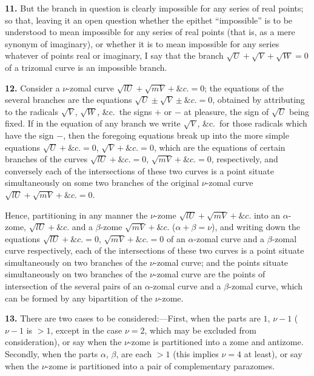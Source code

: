 \documentclass[11pt,a4paper]{article}
\theoremstyle{definition}
\begin{document}
\noindent\textbf{11.} But the branch in question is clearly impossible for any series of real points; so that, leaving it an open question whether the epithet ``impossible'' is to be understood to mean impossible for any series of real points (that is, as a mere synonym of imaginary), or whether it is to mean impossible for any series whatever of points real or imaginary, I say that the branch $\sqrt{U}+\sqrt{V}+\sqrt{W}=0$ of a trizomal curve is an impossible branch.

\setcounter{page}{476}

\noindent\textbf{12.} Consider a $\nu$-zomal curve $\sqrt{lU}+\sqrt{mV}+\&c.=0$; the equations of the several branches are the equations $\sqrt{U}\pm\sqrt{V}\pm\&c.=0$, obtained by attributing to the radicals $\sqrt{V}$, $\sqrt{W}$, \&c.\ the signs $+$ or $-$ at pleasure, the sign of $\sqrt{U}$ being fixed. If in the equation of any branch we write $\sqrt{V}$, \&c.\ for those radicals which have the sign $-$, then the foregoing equations break up into the more simple equations $\sqrt{U}+\&c.=0$, $\sqrt{V}+\&c.=0$, which are the equations of certain branches of the curves $\sqrt{lU}+\&c.=0$, $\sqrt{mV}+\&c.=0$, respectively, and conversely each of the intersections of these two curves is a point situate simultaneously on some two branches of the original $\nu$-zomal curve $\sqrt{lU}+\sqrt{mV}+\&c.=0$.

Hence, partitioning in any manner the $\nu$-zome $\sqrt{lU}+\sqrt{mV}+\&c.$ into an $\alpha$-zome, $\sqrt{lU}+\&c.$ and a $\beta$-zome $\sqrt{mV}+\&c.$ ($\alpha+\beta=\nu$), and writing down the equations $\sqrt{lU}+\&c.=0$, $\sqrt{mV}+\&c.=0$ of an $\alpha$-zomal curve and a $\beta$-zomal curve respectively, each of the intersections of these two curves is a point situate simultaneously on two branches of the $\nu$-zomal curve; and the points situate simultaneously on two branches of the $\nu$-zomal curve are the points of intersection of the several pairs of an $\alpha$-zomal curve and a $\beta$-zomal curve, which can be formed by any bipartition of the $\nu$-zome.

\noindent\textbf{13.} There are two cases to be considered:---First, when the parts are $1$, $\nu-1$ ($\nu-1$ is $>1$, except in the case $\nu=2$, which may be excluded from consideration), or say when the $\nu$-zome is partitioned into a zome and antizome. Secondly, when the parts $\alpha$, $\beta$, are each $>1$ (this implies $\nu=4$ at least), or say when the $\nu$-zome is partitioned into a pair of complementary parazomes.
\end{document}
